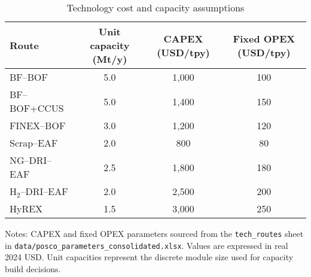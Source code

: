 \begin{table}[ht]
  \centering
  \caption{Technology cost and capacity assumptions}
  \label{tab:tech-costs}
  \begin{threeparttable}
  \begin{tabular}{@{}lccc@{}}
    \toprule
    Route & Unit capacity (Mt/y) & CAPEX (USD/tpy) & Fixed OPEX (USD/tpy) \\
    \midrule
    BF--BOF & 5.0 & 1{,}000 & 100 \\
    BF--BOF+CCUS & 5.0 & 1{,}400 & 150 \\
    FINEX--BOF & 3.0 & 1{,}200 & 120 \\
    Scrap--EAF & 2.0 & 800 & 80 \\
    NG--DRI--EAF & 2.5 & 1{,}800 & 180 \\
    H$_2$--DRI--EAF & 2.0 & 2{,}500 & 200 \\
    HyREX & 1.5 & 3{,}000 & 250 \\
    \bottomrule
  \end{tabular}
  \begin{tablenotes}
    \footnotesize
    \item Notes: CAPEX and fixed OPEX parameters sourced from the \texttt{tech\_routes} sheet in \texttt{data/posco\_parameters\_consolidated.xlsx}. Values are expressed in real 2024 USD. Unit capacities represent the discrete module size used for capacity build decisions.
  \end{tablenotes}
  \end{threeparttable}
\end{table}
